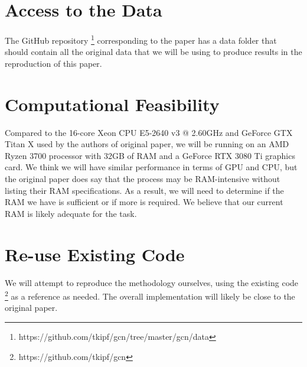 \documentclass[11pt,a4paper]{article}
\begin{document}



\section{Access to the Data}
The GitHub repository \footnote{https://github.com/tkipf/gcn/tree/master/gcn/data} corresponding to the paper has a data folder that should contain all the original data that we will be using to produce results in the reproduction of this paper.

\section{Computational Feasibility}
Compared to the 16-core Xeon CPU E5-2640 v3 @ 2.60GHz and GeForce GTX Titan X used by the authors of original paper, we will be running on an AMD Ryzen 3700 processor with 32GB of RAM and a GeForce RTX 3080 Ti graphics card. We think we will have similar performance in terms of GPU and CPU, but the original paper does say that the process may be RAM-intensive without listing their RAM specifications. As a result, we will need to determine if the RAM we have is sufficient or if more is required. We believe that our current RAM is likely adequate for the task.

\section{Re-use Existing Code}

We will attempt to reproduce the methodology ourselves, using the existing code \footnote{https://github.com/tkipf/gcn} as a reference as needed. The overall implementation will likely be close to the original paper.






\end{document}
